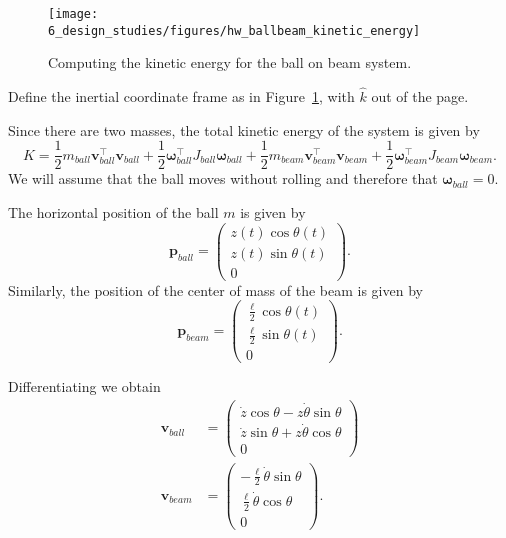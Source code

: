 
\begin{figure}[H]
   \centering
   \texttt{[image: 6\_design\_studies/figures/hw\_ballbeam\_kinetic\_energy]} 
   \caption{Computing the kinetic energy for the ball on beam system.}
   \label{fig:hw_ballbeam_kinetic_energy}
\end{figure}


Define the inertial coordinate frame as in Figure~\ref{fig:hw_ballbeam_kinetic_energy}, with $\hat{k}$ out of the page.  

Since there are two masses, the total kinetic energy of the system is given by
\[
K = \frac{1}{2}m_{ball} \mathbf{v}^{\top}_{ball} \mathbf{v}_{ball} + \frac{1}{2}\boldsymbol{\omega}_{ball}^{\top}J_{ball}\boldsymbol{\omega}_{ball} 
+ \frac{1}{2}m_{beam} \mathbf{v}^{\top}_{beam} \mathbf{v}_{beam} + \frac{1}{2}\boldsymbol{\omega}_{beam}^{\top}J_{beam}\boldsymbol{\omega}_{beam}.
\]
We will assume that the ball moves without rolling and therefore that $\boldsymbol{\omega}_{ball}=0$.

The horizontal position of the ball $m$ is given by 
\[
\mathbf{p}_{ball} = \begin{pmatrix} z(t)\cos\theta(t) \\ z(t)\sin\theta(t) \\ 0 \end{pmatrix}.
\]
Similarly, the position of the center of mass of the beam is given by
\[
\mathbf{p}_{beam} = \begin{pmatrix} \frac{\ell}{2}\cos\theta(t) \\ \frac{\ell}{2}\sin\theta(t) \\ 0 \end{pmatrix}.
\]

Differentiating we obtain
\begin{align*}
\mathbf{v}_{ball} &= \begin{pmatrix} \dot{z}\cos\theta - z\dot{\theta}\sin\theta \\ \dot{z}\sin\theta + z\dot{\theta}\cos\theta \\ 0 \end{pmatrix} \\
\mathbf{v}_{beam} &= \begin{pmatrix} -\frac{\ell}{2}\dot{\theta}\sin\theta \\ \frac{\ell}{2}\dot{\theta}\cos\theta \\ 0 \end{pmatrix}.
\end{align*}

